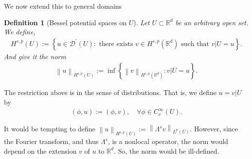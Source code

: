 \documentclass[
    a4paper,
    DIV=14,
    abstract=true,
    numbers=noenddot
]
{scrartcl}
\newtheorem{definition}[theorem]{Definition}
\theoremstyle{definition}
\newcommand{\set}[1]{\left\{#1\right\}}
\renewcommand{\norm}[1]{\left\lVert #1 \right\rVert}\renewcommand{\abs}[1]{\left| #1 \right|}
\newcommand\restr[2]{\left.#1\right|{#2}}
\newcommand{\R}{\mathbb{R}}
\begin{document}
We now extend this to general domains
\begin{definition}[Bessel potential spaces on $U$]\label{bessel potential def U}
    Let $U \subset \R^d$ be an arbitrary open set. We define,
    \begin{align*}
        H^{s,p}(U):=\left\{u \in \mathcal{D}^{\prime}(U): \text{ there exists } v \in H^{s,p}(\R^d) \text{ such that } \restr{v}{U}=u\right\}.
    \end{align*}
    And give it the norm
    \begin{align*}
        \norm{u}_{H^{s,p}(U)}:= \inf \set{\norm{v}_{H^{s,p}(\R^d)}: \restr{v}{U}=u}.
    \end{align*}
\end{definition}
The restriction above is in the sense of distributions. That is, we define $u=\restr{v}{U}$ by
\begin{align*}
    (\phi,u):=(\phi,v), \quad \forall \phi \in C_c^\infty(U).
\end{align*}

It would be tempting to define $\norm{u}_{H^{s,p}(U)}:=\norm{\Lambda^s v}_{L^p(U)}$. However, since the Fourier transform, and thus $\Lambda^s$, is a nonlocal operator, the norm would depend on the extension $v$  of $u$ to $\R^d$. So, the norm would be ill-defined.
\end{document}
